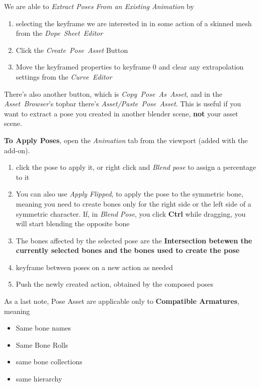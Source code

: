 \documentclass{article}
\begin{document}
We are able to \textit{Extract Poses From an Existing Animation} by
\begin{enumerate}[noitemsep, topsep=0pt]
    \item selecting the keyframe we are interested in in some action of a skinned mesh from the \mbox{\textit{Dope Sheet Editor}}
    \item Click the \mbox{\textit{Create Pose Asset}} Button
    \item Move the keyframed properties to keyframe 0 and clear any extrapolation settings from the \mbox{\textit{Curve Editor}}
\end{enumerate}
There's also another button, which is \mbox{\textit{Copy Pose As Asset}}, and in the \mbox{\textit{Asset Browser}}'s topbar there's \mbox{\textit{Asset/Paste Pose Asset}}. This is useful 
if you want to extract a pose you created in another blender scene, \textbf{not} your asset scene.\par
\textbf{To Apply Poses}, open the \textit{Animation} tab from the viewport (added with the add-on). 
\begin{enumerate}[noitemsep, topsep=0pt]
    \item click the pose to apply it, or right click and \textit{Blend pose} to assign a percentage to it
    \item You can also use \textit{Apply Flipped}, to apply the pose to the symmetric bone, meaning you need to create bones only for the right side or the left side of a symmetric character.
    If, in \textit{Blend Pose}, you click \textbf{Ctrl} while dragging, you will start blending the opposite bone
    \item The bones affected by the selected pose are the \textbf{Intersection betewen the currently selected bones and the bones used to create the pose}
    \item keyframe between poses on a new action as needed
    \item Push the newly created action, obtained by the composed poses
\end{enumerate}
As a last note, Pose Asset are applicable only to \textbf{Compatible Armatures}, meaning
\begin{itemize}[topsep=0pt, noitemsep]
    \item Same bone names
    \item Same Bone Rolls
    \item same bone collections
    \item same hierarchy
\end{itemize}
\end{document}
